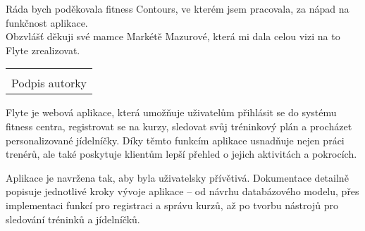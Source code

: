 \documentclass[12pt, a4paper,
twoside,        %
openany
]{report}
\newcommand\datumOdevzdani{14. 1. 2025} %
\begin{document}
	\noindent Ráda bych poděkovala fitness Contours, ve kterém jsem pracovala, za nápad na funkčnost aplikace. \\ Obzvlášť děkuji své mamce Markétě Mazurové, která mi dala celou vizi na to Flyte zrealizovat.


	
	\vspace*{0.6\textheight} %

	\vfill
	\noindent{V Opavě \datumOdevzdani\\}
	\noindent
	\begin{minipage}{\linewidth}
		\hspace{9.5cm} 
		\begin{tabular}{@{}p{6cm}@{}}
			\dotfill \\
			Podpis autorky
		\end{tabular}
	\end{minipage}
	
	\cleardoublepage %


	\noindent 
Flyte je webová aplikace, která umožňuje uživatelům přihlásit se do systému fitness centra, registrovat se na kurzy, sledovat svůj tréninkový plán a procházet personalizované jídelníčky. Díky těmto funkcím aplikace usnadňuje nejen práci trenérů, ale také poskytuje klientům lepší přehled o jejich aktivitách a pokrocích.

Aplikace je navržena tak, aby byla uživatelsky přívětivá. Dokumentace detailně popisuje jednotlivé kroky vývoje aplikace – od návrhu databázového modelu, přes implementaci funkcí pro registraci a správu kurzů, až po tvorbu nástrojů pro sledování tréninků a jídelníčků.
\end{document}
